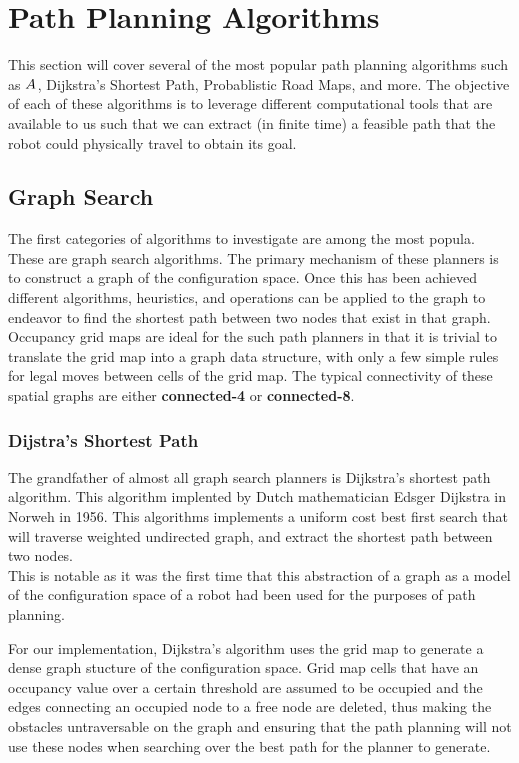 \documentclass[journal]{IEEEtran}
\begin{document}
\section{Path Planning Algorithms}
This section will cover several of the most popular path planning algorithms such as $A^{\*}$, Dijkstra's Shortest Path, Probablistic Road Maps, and more. The objective of each of these algorithms is to leverage different computational tools that are available to us such that we can extract (in finite time) a feasible path that the robot could physically travel to obtain its goal.

\subsection{Graph Search}

The first categories of algorithms to investigate are among the most popula. These are graph search algorithms. The primary mechanism of these planners is to construct a graph of the configuration space. Once this has been achieved different algorithms, heuristics, and operations can be applied to the graph to endeavor to find the shortest path between two nodes that exist in that graph. \\

Occupancy grid maps are ideal for the such path planners in that it is trivial to translate the grid map into a graph data structure, with only a few simple rules for legal moves between cells of the grid map. The typical connectivity of these spatial graphs are either \textbf{connected-4} or \textbf{connected-8}.


\subsubsection{Dijstra's Shortest Path}
The grandfather of almost all graph search planners is Dijkstra's shortest path algorithm. This algorithm implented by Dutch mathematician Edsger Dijkstra in Norweh in 1956. This algorithms implements a uniform cost best first search that will traverse weighted undirected graph, and extract the shortest path between two nodes. \\

This is notable as it was the first time that this abstraction of a graph as a model of the configuration space of a robot had been used for the purposes of path planning. 

For our implementation, Dijkstra's algorithm uses the grid map to generate a dense graph stucture of the configuration space. Grid map cells that have an occupancy value over a certain threshold are assumed to be occupied and the edges connecting an occupied node to a free node are deleted, thus making the obstacles untraversable on the graph and ensuring that the path planning will not use these nodes when searching over the best path for the planner to generate. \\
\end{document}
